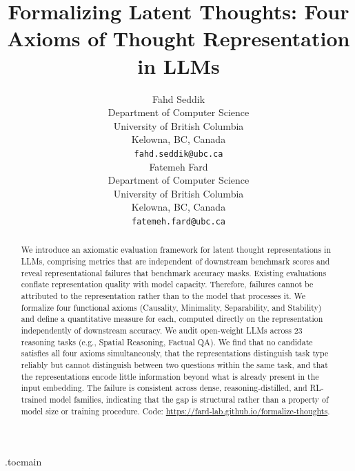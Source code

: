 \documentclass{article}
\title{Formalizing Latent Thoughts: Four Axioms of Thought Representation in LLMs}
\author{%
  Fahd Seddik \\
  Department of Computer Science\\
  University of British Columbia\\
  Kelowna, BC, Canada \\
  \texttt{fahd.seddik@ubc.ca} \\
  \And
  Fatemeh Fard \\
  Department of Computer Science\\
  University of British Columbia\\
  Kelowna, BC, Canada \\
  \texttt{fatemeh.fard@ubc.ca} \\
}
\theoremstyle{plain}
\theoremstyle{definition}
\theoremstyle{remark}
\begin{document}
\etocdepthtag.toc{main}

\maketitle

\begin{abstract}
We introduce an axiomatic evaluation framework for latent thought representations in LLMs, comprising metrics that are independent of downstream benchmark scores and reveal representational failures that benchmark accuracy masks. Existing evaluations conflate representation quality with model capacity. Therefore, failures cannot be attributed to the representation rather than to the model that processes it. We formalize four functional axioms (Causality, Minimality, Separability, and Stability) and define a quantitative measure for each, computed directly on the representation independently of downstream accuracy. We audit open-weight LLMs across 23 reasoning tasks (e.g., Spatial Reasoning, Factual QA). We find that no candidate satisfies all four axioms simultaneously, that the representations distinguish task type reliably but cannot distinguish between two questions within the same task, and that the representations encode little information beyond what is already present in the input embedding. The failure is consistent across dense, reasoning-distilled, and RL-trained model families, indicating that the gap is structural rather than a property of model size or training procedure. Code: \url{https://fard-lab.github.io/formalize-thoughts}.
\end{abstract}








\clearpage



\newpage
\appendix

\end{document}
